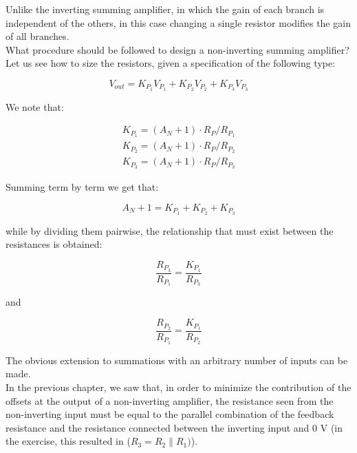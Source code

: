 \documentclass[../main.tex]{subfiles}
\begin{document}
Unlike the inverting summing amplifier, in which the gain of each branch is independent of the others, in this case changing a single resistor modifies the gain of all branches.\\

What procedure should be followed to design a non-inverting summing amplifier? Let us see how to size the resistors, given a specification of the following type:

\begin{equation}
	V_{out} = K_{P_1} V_{P_1} + K_{P_2} V_{P_2} + K_{P_3} V_{P_3}
\end{equation}

We note that:

\begin{equation}
\begin{aligned}
	K_{P_1} = (A_N + 1) \cdot R_P / R_{P_1}\\
	K_{P_2} = (A_N + 1) \cdot R_P / R_{P_2}\\
	K_{P_3} = (A_N + 1) \cdot R_P / R_{P_3}	
\end{aligned}
\end{equation}

Summing term by term we get that:

\begin{equation}
	A_N + 1 = K_{P_1} + K_{P_2} + K_{P_3}
\end{equation}

while by dividing them pairwise, the relationship that must exist between the resistances is obtained:

\begin{equation}
	\frac{R_{P_3}}{R_{P_1}} = \frac{K_{P_1}}{R_{P_3}}
\end{equation}

and

\begin{equation}
	\frac{R_{P_2}}{R_{P_1}} = \frac{K_{P_1}}{R_{P_2}}
\end{equation}


The obvious extension to summations with an arbitrary number of inputs can be made.\\

In the previous chapter, we saw that, in order to minimize the contribution of the offsets at the output of a non-inverting amplifier, the resistance seen from the non-inverting input must be equal to the parallel combination of the feedback resistance and the resistance connected between the inverting input and 0 V (in the exercise, this resulted in ($R_3 = R_2 \parallel R_1)$).\\
\end{document}
